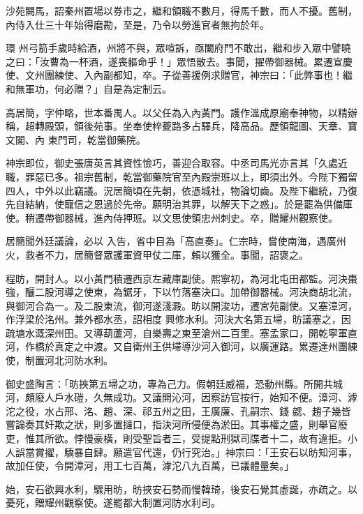 \begin{pinyinscope}
 沙苑闕馬，詔秦州置場以券市之，繼和領職不數月，得馬千數，而人不擾。舊制，內侍入仕三十年始得磨勘，至是，乃令以勞進官者無拘於年。



 環
 州弓箭手歲時給酒，州將不與，眾喧訴，亟闔府門不敢出，繼和步入眾中譬曉之曰：「汝曹為一杯酒，遂喪軀命乎！」眾悟散去。事聞，擢帶御器械。累遷宣慶使、文州團練使、入內副都知，卒。子從善援例求贈官，神宗曰：「此弊事也！繼和無軍功，何必贈？」自是為定制云。



 高居簡，字仲略，世本番禺人。以父任為入內黃門。護作溫成原廟奉神物，以精辦稱，超轉殿頭，領後苑事。坐奉使梓夔路多占驛兵，降高品。歷領龍圖、天章、寶文閣、內
 東門司，乾當御藥院。



 神宗即位，御史張唐英言其資性憸巧，善迎合取容。中丞司馬光亦言其「久處近職，罪惡已多。祖宗舊制，乾當御藥院官至內殿崇班以上，即須出外。今陛下獨留四人，中外以此竊議。況居簡頃在先朝，依憑城社，物論切齒。及陛下繼統，乃復先自結納，使寵信之恩過於先帝。願明治其罪，以解天下之惑」。於是罷為供備庫使。稍遷帶御器械，進內侍押班。以文思使領忠州刺史。卒，贈耀州觀察使。



 居簡聞外廷議論，必以
 入告，省中目為「高直奏」。仁宗時，嘗使南海，遇廣州火，救者不力，居簡督眾護軍資甲仗二庫，賴以獲全。事聞，詔褒之。



 程昉，開封人。以小黃門積遷西京左藏庫副使。熙寧初，為河北屯田都監。河決棗強，釃二股河導之使東，為鋸牙，下以竹落塞決口。加帶御器械。河決商胡北流，與御河合為一。及二股東流，御河遂淺澱。昉以開浚功，遷宮苑副使。又塞漳河，作浮梁於洺州。兼外都水丞，詔相度
 興修水利。河決大名第五埽，昉議塞之，因疏塘水溉深州田。又導葫蘆河，自樂壽之東至滄州二百里。塞孟家口，開乾寧軍直河，作橋於真定之中渡。又自衛州王供埽導沙河入御河，以廣運路。累遷達州團練使，制置河北河防水利。



 御史盛陶言：「昉挾第五埽之功，專為己力。假朝廷威福，恐動州縣。所開共城河，頗廢人戶水磑，久無成功。又議開沁河，因察訪官按行，始知不便。漳河、滹沱之役，水占邢、洺、趙、深、祁五州之田，王廣廉、孔嗣宗、錢
 勰、趙子幾皆嘗論奏其奸欺之狀，則多置撻口，指決河所侵便為淤田。其事權之盛，則舉官廢吏，惟其所欲。悖慢豪橫，則受聖旨者三，受提點刑獄司牒者十二，故有違拒。小人誤當賞擢，驕暴自肆。願遣官代還，仍行究治。」神宗曰：「王安石以昉知河事，故加任使，令開漳河，用工七百萬，滹沱八九百萬，已議體量矣。」



 始，安石欲興水利，驟用昉，昉挾安石勢而慢韓琦，後安石覺其虛誕，亦疏之。以憂死，贈耀州觀察使。遂罷都大制置河防水利司。




\end{pinyinscope}
